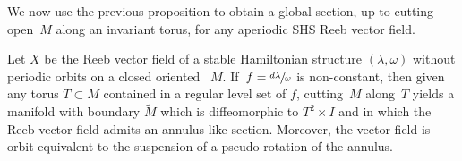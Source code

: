 We now use the previous proposition to obtain a global section, up to cutting open~$M$ along an invariant torus, for any aperiodic SHS Reeb vector field.\enlargethispage{\baselineskip}%

\begin{theorem}\label{thm:SHSannulus}
Let $X$ be the Reeb vector field of a stable Hamiltonian structure $(\lambda,\omega)$ without periodic orbits on a closed oriented \threemanifold~$M$. If~$f=\sfrac{d\lambda}{\omega}$ is non-constant, then given any torus $T\subset M$ contained in a regular level set of $f$, cutting~$M$ along~$T$ yields a manifold with boundary $\widetilde M$ which is diffeomorphic to $T^2\times I$ and in which the Reeb vector field admits an annulus-like section. Moreover, the vector field is orbit equivalent to the suspension of a pseudo-rotation of the annulus.
\end{theorem}

